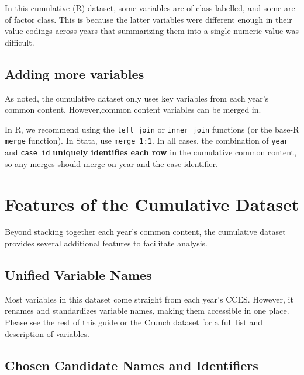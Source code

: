 \documentclass[10pt,article,oneside]{memoir}
\theoremstyle{definition}
\begin{document}
\indent In this cumulative (R) dataset, some variables are of class
labelled, and some are of factor class. This is because the latter
variables were different enough in their value codings across years that
summarizing them into a single numeric value was difficult.

\hypertarget{adding-more-variables}{%
\subsection{Adding more variables}\label{adding-more-variables}}

As noted, the cumulative dataset only uses key variables from each
year's common content. However,common content variables can be merged
in.

In R, we recommend using the \texttt{left\_join} or \texttt{inner\_join}
functions (or the base-R \texttt{merge} function). In Stata, use
\texttt{merge\ 1:1}. In all cases, the combination of \texttt{year} and
\texttt{case\_id} \textbf{uniquely identifies each row} in the
cumulative common content, so any merges should merge on year and the
case identifier.

\newpage

\hypertarget{features-of-the-cumulative-dataset}{%
\section{Features of the Cumulative
Dataset}\label{features-of-the-cumulative-dataset}}

Beyond stacking together each year's common content, the cumulative
dataset provides several additional features to facilitate analysis.

\hypertarget{unified-variable-names}{%
\subsection{Unified Variable Names}\label{unified-variable-names}}

Most variables in this dataset come straight from each year's CCES.
However, it renames and standardizes variable names, making them
accessible in one place. Please see the rest of this guide or the Crunch
dataset for a full list and description of variables.

\hypertarget{chosen-candidate-names-and-identifiers}{%
\subsection{Chosen Candidate Names and
Identifiers}\label{chosen-candidate-names-and-identifiers}}
\end{document}
